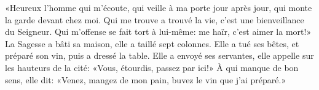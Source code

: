 «Heureux l’homme qui m’écoute,
	qui veille à ma porte jour après jour, qui monte la garde devant chez moi.
Qui me trouve a trouvé la vie, c’est une bienveillance du Seigneur.
	Qui m’offense se fait tort à lui-même: me haïr, c’est aimer la mort!»
La Sagesse a bâti sa maison, elle a taillé sept colonnes.
	Elle a tué ses bêtes, et préparé son vin, puis a dressé la table.
Elle a envoyé ses servantes, elle appelle sur les hauteurs de la cité:
	«Vous, étourdis, passez par ici!»
À qui manque de bon sens, elle dit:
	«Venez, mangez de mon pain, buvez le vin que j’ai préparé.»
